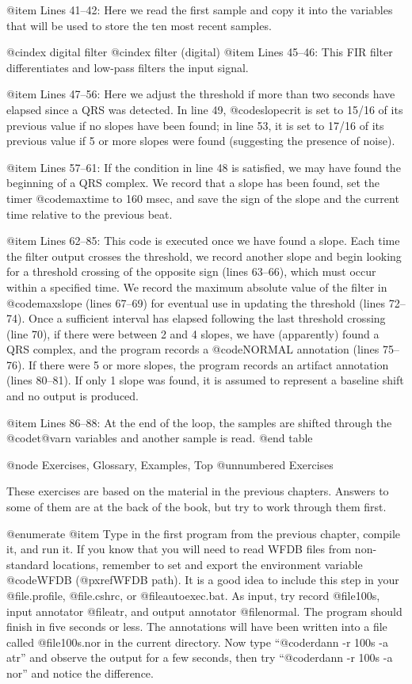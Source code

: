 {{{{{{{{@item Lines 41--42:
Here we read the first sample and copy it into the variables that will
be used to store the ten most recent samples.

@cindex digital filter
@cindex filter (digital)
@item Lines 45--46:
This FIR filter differentiates and low-pass filters the input signal.

@item Lines 47--56:
Here we adjust the threshold if more than two seconds have elapsed since
a QRS was detected.  In line 49, @code{slopecrit} is set to 15/16 of its
previous value if no slopes have been found;  in line 53, it is set to
17/16 of its previous value if 5 or more slopes were found (suggesting
the presence of noise).

@item Lines 57--61:
If the condition in line 48 is satisfied, we may have found the beginning
of a QRS complex.  We record that a slope has been found, set the timer
@code{maxtime} to 160 msec, and save the sign of the slope and the current
time relative to the previous beat.

@item Lines 62--85:
This code is executed once we have found a slope.  Each time the filter
output crosses the threshold, we record another slope and begin looking
for a threshold crossing of the opposite sign (lines 63--66), which must
occur within a specified time.  We record the maximum absolute value of
the filter in @code{maxslope} (lines 67--69) for eventual use in updating
the threshold (lines 72--74).  Once a sufficient interval has elapsed
following the last threshold crossing (line 70), if there were between
2 and 4 slopes, we have (apparently) found a QRS complex, and the program
records a @code{NORMAL} annotation (lines 75--76).  If there were 5 or more
slopes, the program records an artifact annotation (lines 80--81).  If
only 1 slope was found, it is assumed to represent a baseline shift and
no output is produced.

@item Lines 86--88:
At the end of the loop, the samples are shifted through the @code{t@var{n}}
variables and another sample is read.
@end table

@node     Exercises, Glossary, Examples, Top
@unnumbered Exercises

These exercises are based on the material in the previous chapters.
Answers to some of them are at the back of the book, but try to work
through them first.

@enumerate
@item
Type in the first program from the previous chapter, compile it, and run
it.  If you know that you will need to read WFDB files from non-standard
locations, remember to set and export the environment variable @code{WFDB}
(@pxref{WFDB path}).  It is a good idea to include this step in your
@file{.profile}, @file{.cshrc}, or @file{autoexec.bat}.  As input, try
record @file{100s}, input annotator @file{atr}, and output annotator
@file{normal}.  The program should finish in five seconds or less.
The annotations will have been written into a file called
@file{100s.nor} in the current directory.  Now type
``@code{rdann -r 100s -a atr}'' and observe the output
for a few seconds, then try ``@code{rdann -r 100s -a nor}'' and notice the
difference.

}}}}}}}}

